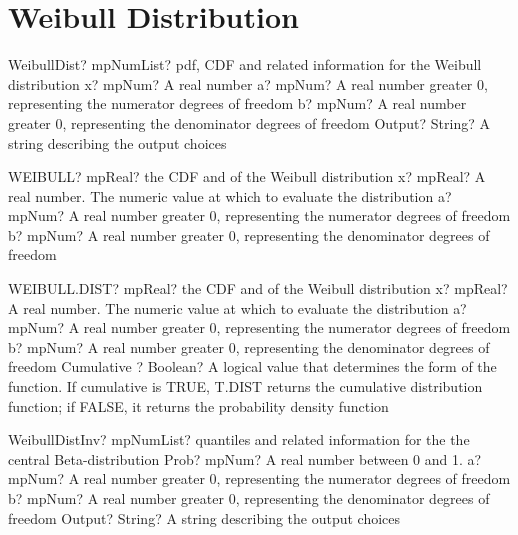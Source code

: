 \documentclass[12pt,a4paper,openany]{book}
\begin{document}
\section{Weibull Distribution}

\begin{mpFunctionsExtract}
\mpFunctionFourNotImplemented
{WeibullDist? mpNumList? pdf, CDF and related information for the Weibull distribution}
{x? mpNum? A real number}
{a? mpNum? A real number greater 0, representing the numerator  degrees of freedom}
{b? mpNum? A real number greater 0, representing the denominator degrees of freedom}
{Output? String? A string describing the output choices}
\end{mpFunctionsExtract}

\begin{mpFunctionsExtract}
\mpWorksheetFunctionThreeNotImplemented
{WEIBULL? mpReal? the CDF and of the Weibull distribution}
{x? mpReal? A real number. The numeric value at which to evaluate the distribution}
{a? mpNum? A real number greater 0, representing the numerator  degrees of freedom}
{b? mpNum? A real number greater 0, representing the denominator degrees of freedom}
\end{mpFunctionsExtract}

\begin{mpFunctionsExtract}
\mpWorksheetFunctionFourNotImplemented
{WEIBULL.DIST? mpReal? the CDF and of the Weibull distribution}
{x? mpReal? A real number. The numeric value at which to evaluate the distribution}
{a? mpNum? A real number greater 0, representing the numerator  degrees of freedom}
{b? mpNum? A real number greater 0, representing the denominator degrees of freedom}
{Cumulative ? Boolean? A logical value that determines the form of the function. If cumulative is TRUE, T.DIST returns the cumulative distribution function; if FALSE, it returns the probability density function}
\end{mpFunctionsExtract}

\begin{mpFunctionsExtract}
\mpFunctionFourNotImplemented
{WeibullDistInv? mpNumList? quantiles and related information for the the central Beta-distribution}
{Prob? mpNum? A real number between 0 and 1.}
{a? mpNum? A real number greater 0, representing the numerator  degrees of freedom}
{b? mpNum? A real number greater 0, representing the denominator degrees of freedom}
{Output? String? A string describing the output choices}
\end{mpFunctionsExtract}
\end{document}
